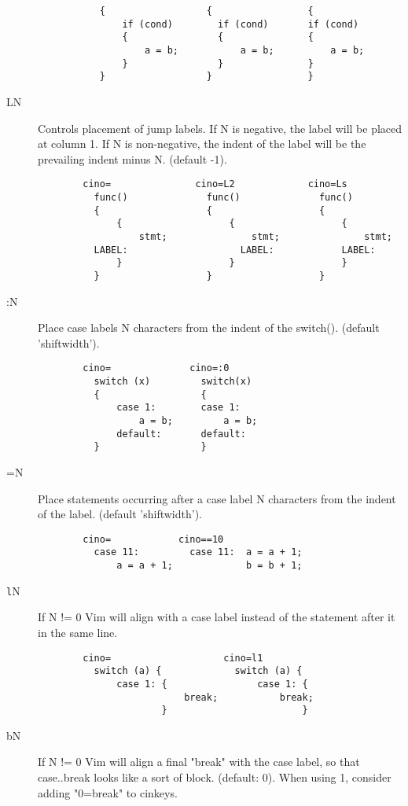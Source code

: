 \begin{description}
\begin{verbatim}
           {                  {                 {
               if (cond)        if (cond)       if (cond)
               {                {               {
                   a = b;           a = b;          a = b;
               }                }               }
           }                  }                 }
 \end{verbatim}
    \item[LN] Controls placement of jump labels. If N is negative, the label
          will be placed at column 1. If N is non-negative, the indent of
          the label will be the prevailing indent minus N.  (default -1).          
\begin{verbatim}
        cino=               cino=L2             cino=Ls
          func()              func()              func()
          {                   {                   {
              {                   {                   {
                  stmt;               stmt;               stmt;
          LABEL:                    LABEL:            LABEL:
              }                   }                   }
          }                   }                   }
 \end{verbatim}
 \clearpage
    \item[:N] Place case labels N characters from the indent of the switch().
          (default 'shiftwidth').
\begin{verbatim}
        cino=              cino=:0
          switch (x)         switch(x)
          {                  {
              case 1:        case 1:
                  a = b;         a = b;
              default:       default:
          }                  }
 \end{verbatim}
 
    \item[=N] Place statements occurring after a case label N characters from
          the indent of the label.  (default 'shiftwidth').
\begin{verbatim}
        cino=            cino==10
          case 11:         case 11:  a = a + 1;
              a = a + 1;             b = b + 1;
 \end{verbatim}
 
    \item[\texttt{l}N] If N != 0 Vim will align with a case label instead of the
          statement after it in the same line.
\begin{verbatim}
        cino=                    cino=l1
          switch (a) {             switch (a) {
              case 1: {                case 1: {
                          break;           break;
                      }                        }
 \end{verbatim}
 \clearpage
    \item[bN] If N != 0 Vim will align a final "break" with the case label,
          so that case..break looks like a sort of block.  (default: 0).
          When using 1, consider adding "0=break" to cinkeys.


\end{description}
